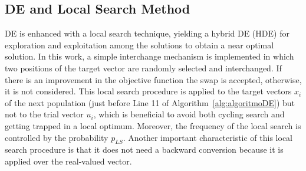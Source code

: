 \subsection{DE and Local Search Method} \label{subsec:HDE}
\vspace{-0.25cm}
DE is enhanced with a local search technique, yielding a hybrid DE (HDE) for exploration and exploitation among the solutions to obtain a near optimal solution. In this work, a simple interchange mechanism is implemented in which two positions of the target vector are randomly selected  and interchanged. If there is an improvement in the objective function the swap is accepted, otherwise, it is not considered. %
This local search procedure is applied to the target vectors $x_{i}$ of the next population (just before Line 11 of Algorithm~\ref{alg:algoritmoDE}) but not to the trial vector $u_{i}$, which is beneficial to avoid both cycling search and getting trapped in a local optimum. Moreover, the frequency of the local search is controlled by the probability $p_{LS}$. Another important characteristic of this local search procedure is that it does not need a backward conversion because it is applied over the real-valued vector.
%
%
%

